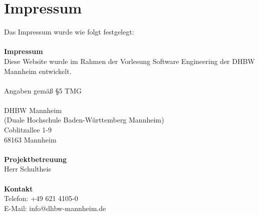 \section*{Impressum}
Das Impressum wurde wie folgt festgelegt:\\\\
\textbf{Impressum}\\
Diese Website wurde im Rahmen der Vorlesung Software Engineering der DHBW Mannheim entwickelt.\\\\
Angaben gemäß §5 TMG\\\\
DHBW Mannheim\\
(Duale Hochschule Baden-Württemberg Mannheim)\\
Coblitzallee 1-9\\
68163 Mannheim\\\\
\textbf{Projektbetreuung}\\
Herr Schultheis\\\\
\textbf{Kontakt}\\
Telefon: +49 621 4105-0\\
E-Mail: info@dhbw-mannheim.de